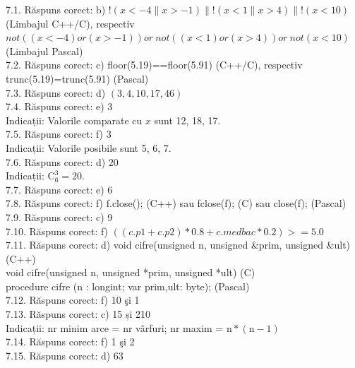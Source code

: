 7.1. Răspuns corect: b) !$(x<-4 \| x>-1)\|!(x<1 \| x>4)\|!(x<10)$ (Limbajul C++/C), respectiv $not((x<-4) or (x>-1)) or\ not((x<1) or (x>4)) or\ not(x<10)$ (Limbajul Pascal)\\

7.2. Răspuns corect: c) floor(5.19)==floor(5.91) (C++/C), respectiv trunc(5.19)=trunc(5.91) (Pascal)\\

7.3. Răspuns corect: d) $(3,4,10,17,46)$\\

7.4. Răspuns corect: e) 3\\
Indicații: Valorile comparate cu $x$ sunt 12, 18, 17.\\

7.5. Răspuns corect: f) 3\\
Indicații: Valorile posibile sunt 5, 6, 7.\\

7.6. Răspuns corect: d) $20$\\
Indicații: $\mathrm{C}_{6}^{3}=20$.\\

7.7. Răspuns corect: e) 6\\

7.8. Răspuns corect: f) f.close(); (C++) sau fclose(f); (C) sau close(f); (Pascal)\\

7.9. Răspuns corect: c) 9\\

7.10. Răspuns corect: f) $((c.p1+c.p2)*0.8+c.medbac*0.2)>=5.0$\\

7.11. Răspuns corect: d) void cifre(unsigned n, unsigned \&prim, unsigned \&ult) (C++)\\ void cifre(unsigned n, unsigned *prim, unsigned *ult) (C)\\ procedure cifre (n : longint; var prim,ult: byte); (Pascal)\\

7.12. Răspuns corect: f) 10 şi 1\\

7.13. Răspuns corect: c) 15 și 210\\
Indicații: nr minim arce = nr vârfuri; nr maxim = $\mathrm{n}*(\mathrm{n}-1)$\\

7.14. Răspuns corect: f) 1 şi 2\\

7.15. Răspuns corect: d) 63\\

